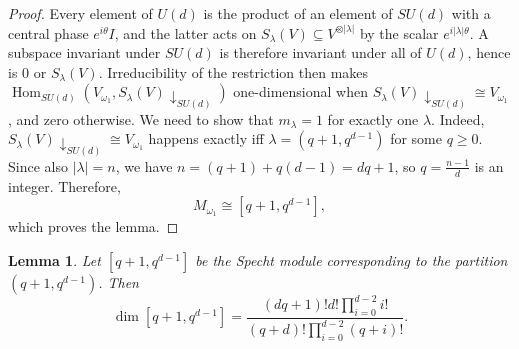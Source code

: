 \documentclass[10pt,twocolumn,superscriptaddress,aps,amsmath,amssymb,citeautoscript,floatfix,prx]{revtex4-2}
\theoremstyle{plain}
\theoremstyle{plain}
\theoremstyle{plain}
\theoremstyle{plain}
\theoremstyle{plain}
\theoremstyle{plain}
\theoremstyle{plain}
\newtheorem{smlemma}[smtheorem]{Lemma}
\theoremstyle{definition}
\theoremstyle{plain}
\begin{document}
\begin{appendix}
\begin{proof}
    Every element of $U(d)$ is the product of an element of $SU(d)$ with a central phase $e^{i\theta}I$, and the latter acts on $S_\lambda(V)\subseteq V^{\otimes|\lambda|}$ 
    by the scalar $e^{i|\lambda|\theta}$. A subspace invariant under $SU(d)$ is therefore invariant under all of $U(d)$, hence is $0$ or $S_\lambda(V)$. 
    Irreducibility of the restriction then makes $\operatorname{Hom}_{SU(d)}(V_{\omega_1},S_\lambda(V)\downarrow_{SU(d)})$ one-dimensional when $S_\lambda(V)\downarrow_{SU(d)}\cong V_{\omega_1}$, and zero otherwise.
    We need to show that $m_\lambda=1$ for exactly one $\lambda$. Indeed,
    $S_\lambda(V) \downarrow_{S U(d)} \cong V_{\omega_1}$ happens exactly iff $\lambda=\left(q+1, q^{d-1}\right)$ for some $q\geq 0$.
    Since also $|\lambda|=n$, we have $n=(q+1)+q(d-1)=d q+1$, so $q=\frac{n-1}{d}$ is an integer. 
    Therefore,
    \[
        M_{\omega_1} \cong\left[q+1, q^{d-1}\right],
    \]
    which proves the lemma.
\end{proof}

\begin{smlemma}\label{lem:dimension_formula}
    Let $[q+1, q^{d-1}]$ be the Specht module corresponding to the partition $(q+1, q^{d-1})$. Then
    \[
        \operatorname{dim} [q+1, q^{d-1}] = \frac{(d q+1)!d!\prod_{i=0}^{d-2} i!}{(q+d)!\prod_{i=0}^{d-2}(q+i)!}.
    \]
\end{smlemma}


\end{appendix}
\end{document}
